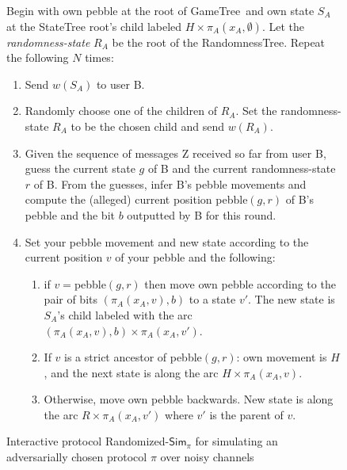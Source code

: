 \documentclass[ letterpaper, 11pt]{article}
\newcommand{\gametree}{\textsf{GameTree}\xspace}
\newcommand{\statetree}{{\textsf{StateTree}}\xspace}
\newcommand{\randomtree}{{\textsf{RandomnessTree}}\xspace}
\newcommand{\Sim}{{\mathsf{Sim}_\pi}}
\begin{document}
\begin{figure}[htb]
\begin{framed}
\small
Begin with own pebble at the root of \gametree\ and own state $S_A$ at the \statetree root's child labeled
$H \times \pi_A(x_A, \emptyset)$. Let the \emph{randomness-state} $R_A$ be the root of the \randomtree.
Repeat the following $N$ times:
\begin{enumerate}
\item Send $w(S_A)$ to user B.
\item Randomly choose one of the children of $R_A$. Set the randomness-state $R_A$ to be
the chosen child and send $w(R_A)$.
\item Given the sequence of messages Z received so far from user B, guess the
current state $g$ of B and the current randomness-state $r$ of B.
From the guesses, infer B's pebble movements and compute the
(alleged) current position pebble$(g,r)$ of B's pebble and the bit $b$ outputted by B for this round.
\item Set your pebble movement and new state
according to the current position $v$ of your pebble  and the following:
    \begin{enumerate}
    \item if $v={}$pebble$(g,r)$ then move own pebble according to the pair of bits
    $(\pi_A(x_A,v),b)$ to a state $v'$.
    The new state is $S_A$'s child labeled with the arc $(\pi_A(x_A,v),b)\times \pi_A( x_A, v')$.
    \item If $v$ is a strict ancestor of pebble$(g,r)$: own movement is $H$, and the
    next state is along the arc $H\times \pi_A(x_A,v)$.
    \item Otherwise, move own pebble backwards. New state is along the arc $R\times \pi_A(x_A,v')$
    where $v'$ is the parent of $v$.
    \end{enumerate}
\end{enumerate}
\end{framed}
\caption{Interactive protocol Randomized-$\Sim$ for
  simulating an adversarially chosen protocol $\pi$ over noisy channels}
\label{alg:protocolAdaptive}
\end{figure}
\end{document}
